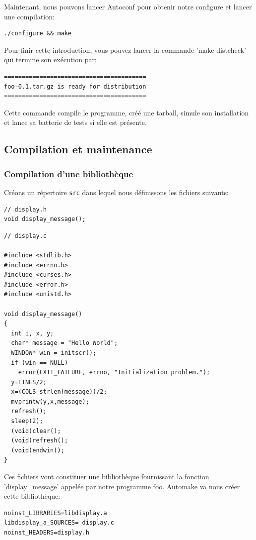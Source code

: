 \documentclass[11pt,a4paper]{article}
\begin{document}
Maintenant, nous pouvons lancer Autoconf pour obtenir notre configure
et lancer une compilation:

{\small
\begin{verbatim}
./configure && make
\end{verbatim}
}

Pour finir cette introduction, vous pouvez lancer la commande 'make
distcheck' qui termine son exécution par:

{\small
\begin{verbatim}
========================================
foo-0.1.tar.gz is ready for distribution
========================================
\end{verbatim}
}

Cette commande compile le programme, créé une tarball, simule son
installation et lance sa batterie de tests si elle est présente.

\subsection{Compilation et maintenance}

\subsubsection{Compilation d'une bibliothèque}

Créons un répertoire \texttt{src} dans lequel nous définissons les
fichiers suivants:
{\small
\begin{verbatim}
// display.h
void display_message();
\end{verbatim}
}

{\small
\begin{verbatim}
// display.c

#include <stdlib.h>
#include <errno.h>
#include <curses.h>
#include <error.h>
#include <unistd.h>

void display_message()
{
  int i, x, y;
  char* message = "Hello World";
  WINDOW* win = initscr();
  if (win == NULL)
    error(EXIT_FAILURE, errno, "Initialization problem.");
  y=LINES/2;
  x=(COLS-strlen(message))/2;
  mvprintw(y,x,message);
  refresh();
  sleep(2);
  (void)clear();
  (void)refresh();
  (void)endwin();
}
\end{verbatim}
}

Ces fichiers vont constituer une bibliothèque fournissant la fonction
'display\_message' appelée par notre programme foo. Automake va nous
créer cette bibliothèque:

{\small
\begin{verbatim}
noinst_LIBRARIES=libdisplay.a
libdisplay_a_SOURCES= display.c
noinst_HEADERS=display.h
\end{verbatim}
}
\end{document}

